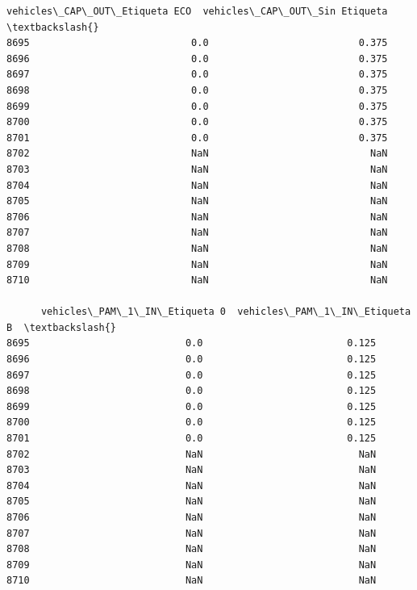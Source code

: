 \documentclass[11pt]{article}
\begin{document}
\begin{tcolorbox}[breakable, size=fbox, boxrule=.5pt, pad at break*=1mm, opacityfill=0]
\begin{Verbatim}[commandchars=\\\{\}]
      vehicles\_CAP\_OUT\_Etiqueta ECO  vehicles\_CAP\_OUT\_Sin Etiqueta  \textbackslash{}
8695                            0.0                          0.375
8696                            0.0                          0.375
8697                            0.0                          0.375
8698                            0.0                          0.375
8699                            0.0                          0.375
8700                            0.0                          0.375
8701                            0.0                          0.375
8702                            NaN                            NaN
8703                            NaN                            NaN
8704                            NaN                            NaN
8705                            NaN                            NaN
8706                            NaN                            NaN
8707                            NaN                            NaN
8708                            NaN                            NaN
8709                            NaN                            NaN
8710                            NaN                            NaN

      vehicles\_PAM\_1\_IN\_Etiqueta 0  vehicles\_PAM\_1\_IN\_Etiqueta B  \textbackslash{}
8695                           0.0                         0.125
8696                           0.0                         0.125
8697                           0.0                         0.125
8698                           0.0                         0.125
8699                           0.0                         0.125
8700                           0.0                         0.125
8701                           0.0                         0.125
8702                           NaN                           NaN
8703                           NaN                           NaN
8704                           NaN                           NaN
8705                           NaN                           NaN
8706                           NaN                           NaN
8707                           NaN                           NaN
8708                           NaN                           NaN
8709                           NaN                           NaN
8710                           NaN                           NaN


\end{Verbatim}
\end{tcolorbox}
\end{document}
